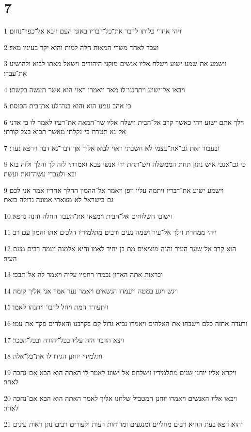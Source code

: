 \chapter{7}

\par 1 ויהי אחרי כלותו לדבר את־כל־דבריו באזני העם ויבא אל־כפר־נחום׃
\par 2 ועבד לאחד משרי המאות חלה למות והוא יקר בעיניו מאד׃
\par 3 וישמע את־שמע ישוע וישלח אליו אנשים מזקני היהודים וישאל מאתו לבוא ולהושיע את־עבדו׃
\par 4 ויבאו אל־ישוע ויתחננו־לו מאד ויאמרו ראוי הוא אשר תעשה בקשתו׃
\par 5 כי אהב עמנו הוא והוא בנה־לנו את־בית הכנסת׃
\par 6 וילך אתם ישוע ויהי כאשר קרב אל־הבית וישלח אליו שר־המאה את־רעיו לאמר לו בי אדני אל־נא תטרח כי־נקלתי מאשר תבוא בצל קורתי׃
\par 7 ובעבור זאת גם־את־עצמי לא חשבתי ראוי לבוא אליך אך דבר־נא דבר וירפא נערי׃
\par 8 כי גם־אנכי איש נתון תחת הממשלה ויש־תחת ידי אנשי צבא ואמרתי לזה לך והלך ולזה בוא ובא ולעבדי עשה־זאת ועשה׃
\par 9 וישמע ישוע את־דבריו ויתמה עליו ויפן ויאמר אל־ההמון ההלך אחריו אמר אני לכם גם־בישראל לא־מצאתי אמונה גדולה כזאת׃
\par 10 וישובו השלוחים אל־הבית וימצאו את־העבד החלה והנה נרפא׃
\par 11 ויהי ממחרת וילך אל־עיר ושמה נעים ורבים מתלמידיו הלכים אתו והמון עם רב׃
\par 12 הוא קרב אל־שער העיר והנה מוציאים מת בן יחיד לאמו והיא אלמנה ועמה רבים מעם העיר׃
\par 13 וכראות אתה האדון נכמרו רחמיו עליה ויאמר לה אל־תבכי׃
\par 14 ויגש ויגע במטה ויעמדו הנשאים ויאמר נער אמר אני אליך קומה׃
\par 15 ויתעודד המת ויחל לדבר ויתנהו לאמו׃
\par 16 ורעדה אחזה כלם וישבחו את־האלהים ויאמרו נביא גדול קם בקרבנו והאלהים פקד את־עמו׃
\par 17 ויצא הדבר הזה עליו בכל־יהודה ובכל־הככר׃
\par 18 ותלמידי יוחנן הגידו לו את־כל־אלה׃
\par 19 ויקרא אליו יוחנן שנים מתלמידיו וישלחם אל־ישוע לאמר לו האתה הוא הבא אם־נחכה לאחר׃
\par 20 ויבאו אליו האנשים ויאמרו יוחנן המטביל שלחנו אליך לאמר האתה הוא הבא אם־נחכה לאחר׃
\par 21 והוא רפא בעת ההיא רבים מחליים ומנגעים ומרוחות רעות ולעורים רבים נתן ראות עינים׃
